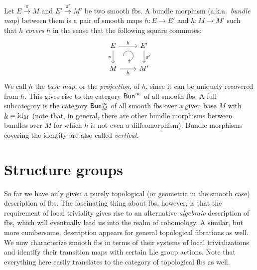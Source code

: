 \begin{defn}
    Let $E\overset{\pi}{\to}M$ and $E'\overset{\pi'}{\to}M'$ be two smooth \glspl{fb}. A bundle morphism (a.k.a.\ \emph{bundle map}) between them is a pair of smooth maps $h:E\to E'$ and $\underline{h}:M\to M'$ such that $h$ \emph{covers} $\underline{h}$ in the sense that the following square commutes:
    \[\begin{tikzcd}[every matrix/.append style={name=m},   
    execute at end picture={\draw [<-] ([xshift=-8mm,yshift=1mm]m-2-2.north) arc[start angle=-90,delta angle=270,radius=0.25cm];}]
       E \arrow[r,"h"]\arrow[d,swap,"\pi"]& E'\arrow[d,"\pi'"] \\
       M\arrow[r,swap,"\underline{h}"]& M'
    \end{tikzcd}\]
    We call $\underline{h}$ the \emph{base map}, or the \emph{projection}, of $h$, since it can be uniquely recovered from $h$.
    This gives rise to the category $\mathsf{Bun}^\infty$ of all smooth \glspl{fb}. A full subcategory is the category $\mathsf{Bun}^\infty_M$ of all smooth \glspl{fb} over a given base $M$ with $\underline{h}=\operatorname{id}_M$ (note that, in general, there are other bundle morphisms between bundles over $M$ for which $\underline{h}$ is not even a diffeomorphism). Bundle morphisms covering the identity are also called \emph{vertical}.
\end{defn}








\section{Structure groups}\label{sec: structure groups}

So far we have only given a purely topological (or geometric in the smooth case) description of \glspl{fb}. The fascinating thing about \glspl{fb}, however, is that the requirement of local triviality gives rise to an alternative \emph{algebraic} description of \glspl{fb}, which will eventually lead us into the realm of cohomology. A similar, but more cumbersome, description appears for general topological fibrations as well. We now characterize smooth \glspl{fb} in terms of their systems of local trivializations and identify their transition maps with certain Lie group actions. Note that everything here easily translates to the category of topological \glspl{fb} as well.


